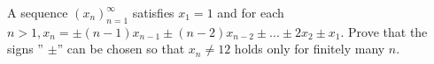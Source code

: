 A sequence $(x_n)_{n= 1}^{\infty}$ satisfies $x_1 = 1$ and for each $n > 1, x_n = \pm (n-1)x_{n-1} \pm  (n-2)x_{n-2} \pm  ... \pm 2x_2  \pm x_1$. Prove that the signs ” $\pm$” can be chosen so that $x_n \ne 12$ holds only for finitely many $n$.